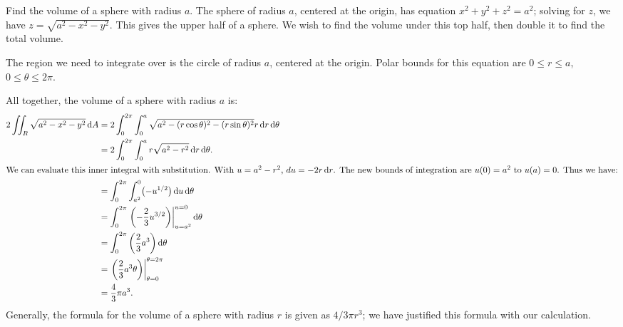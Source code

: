 \begin{example}\label{ex_doublepol3}%
Find the volume of a sphere with radius $a$.
\solution
The sphere of radius $a$, centered at the origin, has equation $x^2+y^2+z^2=a^2$; solving for $z$, we have $z=\sqrt{a^2-x^2-y^2}$. This gives the upper half of a sphere. We wish to find the volume under this top half, then double it to find the total volume. 

The region we need to integrate over is the circle of radius $a$, centered at the origin. Polar bounds for this equation are $0\leq r\leq a$, $0\leq\theta\leq2\pi$.

All together, the volume of a sphere with radius $a$ is:
\begin{align*}
2\iint_R\sqrt{a^2-x^2-y^2}\dd A &= 2\int_0^{2\pi}\int_0^a\sqrt{a^2-(r\cos\theta)^2-(r\sin\theta)^2}r\dd r\dd\theta\\
		&=2\int_0^{2\pi}\int_0^ar\sqrt{a^2-r^2}\dd r\dd\theta.\\
\intertext{We can evaluate this inner integral with substitution. With \intertextmath{u=a^2-r^2}, \intertextmath{du = -2r\dd r}. The new bounds of integration are \intertextmath{u(0) = a^2} to \intertextmath{u(a)=0}. Thus we have:}
	&= \int_0^{2\pi}\int_{a^2}^0\bigl(-u^{1/2}\bigr)\dd u\dd\theta\\
	&= \int_0^{2\pi}\left.\left(-\frac23u^{3/2}\right)\right|_{u=a^2}^{u=0}\dd\theta\\
	&= \int_0^{2\pi}\left(\frac23a^3\right)\dd\theta\\
	&= \left.\left(\frac23a^3\theta\right)\right|_{\theta=0}^{\theta=2\pi}\\
	&= \frac43\pi a^3.
\end{align*}
Generally, the formula for the volume of a sphere with radius $r$ is given as $4/3\pi r^3$; we have justified this formula with our calculation.
\end{example}


